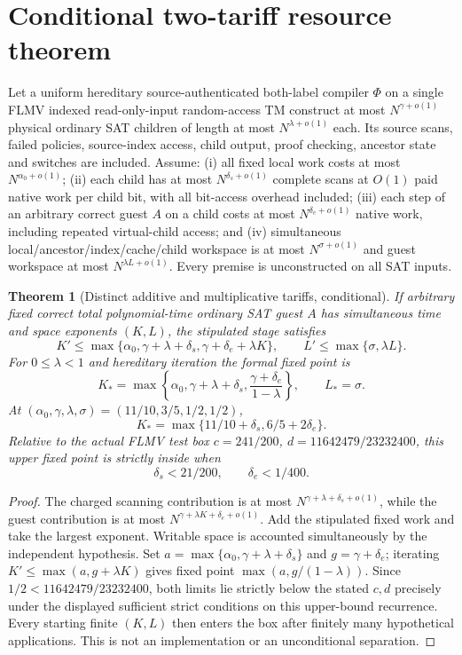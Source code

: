 \documentclass[11pt]{article}
\newtheorem{theorem}{Theorem}
\begin{document}
\section{Conditional two-tariff resource theorem}
Let a uniform hereditary source-authenticated both-label compiler $\Phi$ on a single FLMV indexed read-only-input random-access TM construct at most $N^{\gamma+o(1)}$ physical ordinary SAT children of length at most $N^{\lambda+o(1)}$ each. Its source scans, failed policies, source-index access, child output, proof checking, ancestor state and switches are included. Assume: (i) all fixed local work costs at most $N^{\alpha_0+o(1)}$; (ii) each child has at most $N^{\delta_s+o(1)}$ complete scans at $O(1)$ paid native work per child bit, with all bit-access overhead included; (iii) each step of an arbitrary correct guest $A$ on a child costs at most $N^{\delta_e+o(1)}$ native work, including repeated virtual-child access; and (iv) simultaneous local/ancestor/index/cache/child workspace is at most $N^{\sigma+o(1)}$ and guest workspace at most $N^{\lambda L+o(1)}$. Every premise is unconstructed on all SAT inputs.

\begin{theorem}[Distinct additive and multiplicative tariffs, conditional]
If arbitrary fixed correct total polynomial-time ordinary SAT guest $A$ has simultaneous time and space exponents $(K,L)$, the stipulated stage satisfies
\[
 K'\le\max\{\alpha_0,\gamma+\lambda+\delta_s,
                   \gamma+\delta_e+\lambda K\},\qquad
 L'\le\max\{\sigma,\lambda L\}.
\]
For $0\le\lambda<1$ and hereditary iteration the formal fixed point is
\[
 K_*=\max\left\{\alpha_0,\gamma+\lambda+\delta_s,
                  \frac{\gamma+\delta_e}{1-\lambda}\right\},
 \qquad L_*=\sigma.
\]
At $(\alpha_0,\gamma,\lambda,\sigma)=(11/10,3/5,1/2,1/2)$,
\[
 K_*=\max\{11/10+\delta_s,6/5+2\delta_e\}.
\]
Relative to the \emph{actual} FLMV test box $c=241/200$,
$d=11642479/23232400$, this upper fixed point is strictly inside when
\[
 \boxed{\delta_s<21/200,\qquad \delta_e<1/400.}
\]
\end{theorem}
\begin{proof}
The charged scanning contribution is at most
$N^{\gamma+\lambda+\delta_s+o(1)}$, while the guest contribution is at most
$N^{\gamma+\lambda K+\delta_e+o(1)}$. Add the stipulated fixed work and
take the largest exponent. Writable space is accounted simultaneously by
the independent hypothesis. Set
$a=\max\{\alpha_0,\gamma+\lambda+\delta_s\}$
and $g=\gamma+\delta_e$; iterating $K'\le\max(a,g+\lambda K)$
gives fixed point $\max(a,g/(1-\lambda))$.
Since $1/2<11642479/23232400$, both limits lie strictly below the
stated $c,d$ precisely under the displayed sufficient strict conditions
on this upper-bound recurrence. Every starting finite $(K,L)$ then
enters the box after finitely many hypothetical applications.
This is not an implementation or an unconditional separation.
\end{proof}
\end{document}
